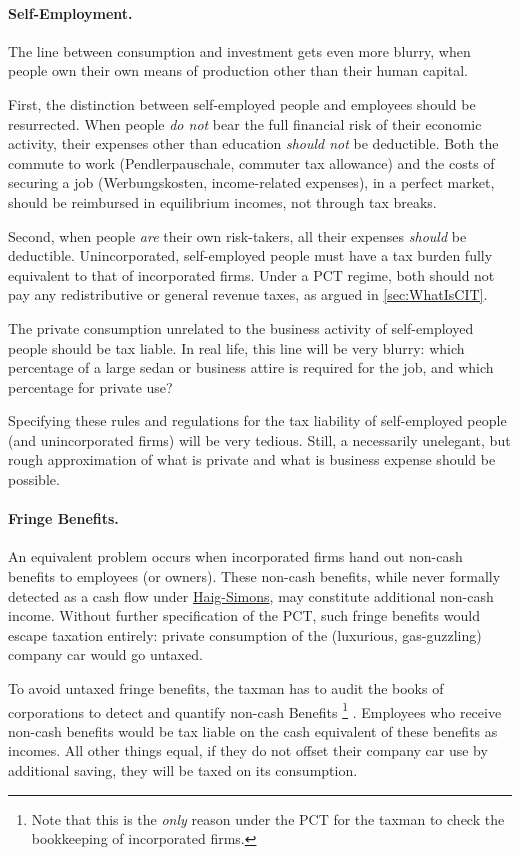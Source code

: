 \paragraph{Self-Employment.} The line between consumption and investment gets even more blurry, when people own their own means of production other than their human capital.

First, the distinction between self-employed people and employees should be resurrected.
When people \emph{do not} bear the full financial risk of their economic activity, their expenses other than education \emph{should not} be deductible.
Both the commute to work (Pendlerpauschale, commuter tax allowance) and the costs of securing a job (Werbungskosten, income-related expenses), in a perfect market, should be reimbursed in equilibrium incomes, not through tax breaks.

Second, when people \emph{are} their own risk-takers, all their expenses \emph{should} be deductible.
Unincorporated, self-employed people must have a tax burden fully equivalent to that of incorporated firms.
Under a PCT regime, both should not pay any redistributive or general revenue taxes, as argued in \autoref{sec:WhatIsCIT}.

The private consumption unrelated to the business activity of self-employed people should be tax liable.
In real life, this line will be very blurry:
which percentage of a large sedan or business attire is required for the job, and which percentage for private use?

Specifying these rules and regulations for the tax liability of self-employed people (and unincorporated firms) will be very tedious.
Still, a necessarily unelegant, but rough approximation of what is private and what is business expense should be possible.

\paragraph{Fringe Benefits.} An equivalent problem occurs when incorporated firms hand out non-cash benefits to employees (or owners).
These non-cash benefits, while never formally detected as a cash flow under \hyperref[eq:HaigSimonsPCT]{Haig-Simons}, may constitute additional non-cash income.
Without further specification of the PCT, such fringe benefits would escape taxation entirely:
private consumption of the (luxurious, gas-guzzling) company car would go untaxed.

To avoid untaxed fringe benefits, the taxman has to audit the books of corporations to detect and quantify non-cash Benefits
\footnote{
	Note that this is the \emph{only} reason under the PCT for the taxman to check the bookkeeping of incorporated firms.
}
.
Employees who receive non-cash benefits would be tax liable on the cash equivalent of these benefits as incomes.
All other things equal, if they do not offset their company car use by additional saving, they will be taxed on its consumption.

